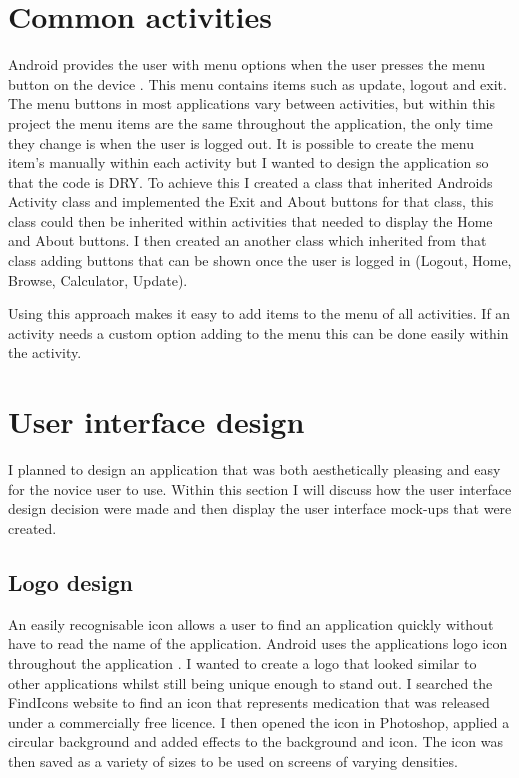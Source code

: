 \section{Common activities}
Android provides the user with menu options when the user presses the menu button on the device \cite{android}. This menu contains items such as update, logout and exit. The menu buttons in most applications vary between activities, but within this project the menu items are the same throughout the application, the only time they change is when the user is logged out. 
It is possible to create the menu item's manually within each activity but I wanted to design the application so that the code is DRY. To achieve this I created a class that inherited Androids Activity class and implemented the Exit and About buttons for that class, this class could then be inherited within activities that needed to display the Home and About buttons. I then created an another class which inherited from that class adding buttons that can be shown once the user is logged in (Logout, Home, Browse, Calculator, Update). 

Using this approach makes it easy to add items to the menu of all activities. If an activity needs a custom option adding to the menu this can be done easily within the activity.

\section{User interface design}

I planned to design an application that was both aesthetically pleasing and easy for the novice user to use. Within this section I will discuss how the user interface design decision were made and then display the user interface mock-ups that were created.

\subsection{Logo design}

An easily recognisable icon allows a user to find an application quickly without have to read the name of the application. Android uses the applications logo icon throughout the application \cite{android}. I wanted to create a logo that looked similar to other applications whilst still being unique enough to stand out. I searched the FindIcons website \cite{findicons} to find an icon that represents medication that was released under a commercially free licence. I then opened the icon in Photoshop, applied a circular background and added effects to the background and icon. The icon was then saved as a variety of sizes to be used on screens of varying densities.

